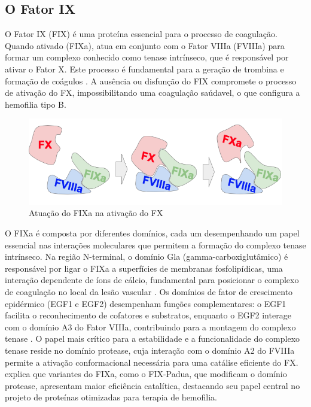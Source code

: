 \subsection{O Fator IX}
O Fator IX (FIX) é uma proteína essencial para o processo de coagulação.
Quando ativado (FIXa), atua em conjunto com o Fator VIIIa (FVIIIa) para formar 
um complexo conhecido como tenase intrínseco, que é responsável por ativar o Fator X. 
Este processo é fundamental para a geração de trombina e formação de coágulos \cite{FIX}. 
A ausência ou disfunção do FIX compromete o processo de ativação do FX,
impossibilitando uma coagulação saúdavel, o que configura a hemofilia tipo B.

\begin{figure}[H]
    \centering
    \includegraphics[width=.8\textwidth]{figuras/ativaFX.png}
    \caption{Atuação do FIXa na ativação do FX}
  \end{figure}

O FIXa é composta por diferentes domínios,
cada um desempenhando um papel essencial nas interações moleculares que permitem a formação do complexo tenase intrínseco. 
Na região N-terminal, o domínio Gla (gamma-carboxiglutâmico) é responsável por ligar o FIXa a superfícies de membranas fosfolipídicas, 
uma interação dependente de íons de cálcio, 
fundamental para posicionar o complexo de coagulação no local da lesão vascular \cite{FIX}. 
Os domínios de fator de crescimento epidérmico (EGF1 e EGF2) desempenham funções complementares: 
o EGF1 facilita o reconhecimento de cofatores e substratos, enquanto o EGF2 interage com o domínio A3 do Fator VIIIa,
contribuindo para a montagem do complexo tenase \cite{FIX}. 
O papel mais crítico para a estabilidade e a funcionalidade do complexo tenase reside no domínio protease,
cuja interação com o domínio A2 do FVIIIa permite a ativação conformacional necessária para uma catálise eficiente do FX.
\cite{FIX} explica que variantes do FIXa, como o FIX-Padua, que modificam o domínio protease, 
apresentam maior eficiência catalítica, destacando seu papel central no projeto de proteínas otimizadas para terapia de hemofilia.

